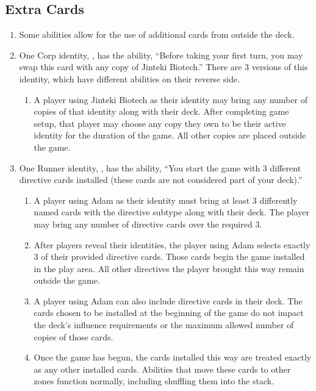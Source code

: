 \subsection{Extra Cards}
\begin{enumerate}
	\item Some abilities allow for the use of additional cards from outside the deck.
	\item One Corp identity, , has the ability, ``Before taking your first turn, you may swap this card with any copy of Jinteki Biotech.'' There are 3 versions of this identity, which have different abilities on their reverse side.
	      \begin{enumerate}
		      \item A player using Jinteki Biotech as their identity may bring any number of copies of that identity along with their deck. After completing game setup, that player may choose any copy they own to be their active identity for the duration of the game. All other copies are placed outside the game.
	      \end{enumerate}
	\item One Runner identity, , has the ability, ``You start the game with 3 different directive cards installed (these cards are not considered part of your deck).''
	      \begin{enumerate}
		      \item A player using Adam as their identity must bring at least 3 differently named cards with the directive subtype along with their deck. The player may bring any number of directive cards over the required 3.
		      \item After players reveal their identities, the player using Adam selects exactly 3 of their provided directive cards. Those cards begin the game installed in the play area. All other directives the player brought this way remain outside the game.
		      \item A player using Adam can also include directive cards in their deck. The cards chosen to be installed at the beginning of the game do not impact the deck's influence requirements or the maximum allowed number of copies of those cards.
		      \item Once the game has begun, the cards installed this way are treated exactly as any other installed cards. Abilities that move these cards to other zones function normally, including shuffling them into the stack.
	      \end{enumerate}

\end{enumerate}
